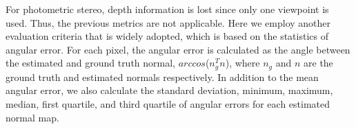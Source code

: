 For photometric stereo, depth information is lost since only one viewpoint is used. Thus, the previous metrics are not applicable. Here we employ another evaluation criteria that is widely adopted, which is based on the statistics of angular error. For each pixel, the angular error is calculated as the angle between the estimated and ground truth normal, \ie $arccos$($n_g^T n$), where $n_g$ and $n$ are the ground truth and estimated normals respectively. In addition to the mean angular error, we also calculate the standard deviation, minimum, maximum, median, first quartile, and third quartile of angular errors for each estimated normal map.





  
